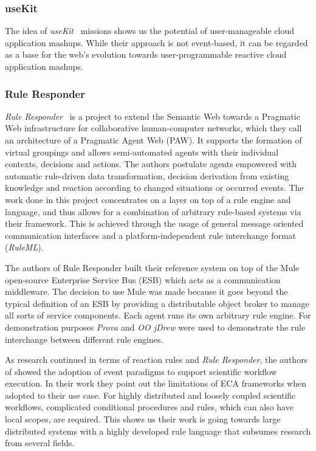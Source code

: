 \documentclass[11pt]{article}%
\begin{document}
\subsubsection{useKit}
The idea of \emph{useKit}~\cite{2010-Rizzotti_Burkhart-useKit.pdf} missions shows us the potential of user-manageable cloud application mashups. While their approach is not event-based, it can be regarded as a base for the web's evolution towards user-programmable reactive cloud application mashups.

\subsubsection{Rule Responder}
\emph{Rule Responder}~\cite{2007-Paschke_etal-RuleResponder.pdf} is a project to extend the Semantic Web towards a Pragmatic Web infrastructure for collaborative human-computer networks, which they call an architecture of a Pragmatic Agent Web (PAW). It supports the formation of virtual groupings and allows semi-automated agents with their individual contexts, decisions and actions. The authors postulate agents empowered with automatic rule-driven data transformation, decision derivation from existing knowledge and reaction according to changed situations or occurred events. The work done in this project concentrates on a layer on top of a rule engine and language, and thus allows for a combination of arbitrary rule-based systems via their framework. This is achieved through the usage of general message oriented communication interfaces and a platform-independent rule interchange format (\emph{RuleML}).

The authors of Rule Responder built their reference system\cite{wwwruleresponder} on top of the Mule~\cite{wwwmuleesb} open-source Enterprise Service Bus (ESB) which acts as a communication middleware. The decision to use Mule was made because it goes beyond the typical definition of an ESB by providing a distributable object broker to manage all sorts of service components. Each agent runs its own arbitrary rule engine. For demonstration purposes \emph{Prova} and \emph{OO jDrew} were used to demonstrate the rule interchange between different rule engines.

As research continued in terms of reaction rules and \textit{Rule Responder}, the authors of \cite{2013_Zhao-Paschke_EDSWE.pdf} showed the adoption of event paradigms to support scientific workflow execution. In their work they point out the limitations of ECA frameworks when adopted to their use case. For highly distributed and loosely coupled scientific workflows, complicated conditional procedures and rules, which can also have local scopes, are required. This shows us their work is going towards large distributed systems with a highly developed rule language that subsumes research from several fields.
\end{document}
